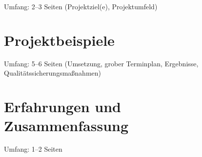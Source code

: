 \documentclass[type=internship,theme=default,language=german,smartquotes]{hgbthesis}
\begin{document}
Umfang: 2--3 Seiten (Projektziel(e), Projektumfeld)

     
\chapter{Projektbeispiele}

Umfang: 5--6 Seiten (Umsetzung, grober Terminplan, Ergebnisse,
Qualitätssicherungsmaßnahmen)


\chapter{Erfahrungen und Zusammenfassung}

Umfang: 1--2 Seiten


\end{document}
